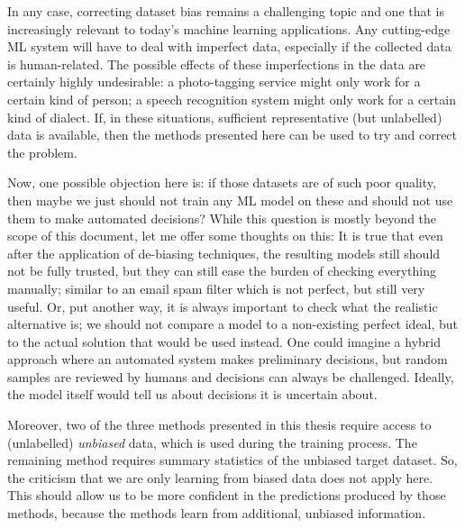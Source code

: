 

In any case, correcting dataset bias remains a challenging topic
and one that is increasingly relevant to today's machine learning applications.
Any cutting-edge \ac{ML} system will have to deal with imperfect data,
especially if the collected data is human-related.
The possible effects of these imperfections in the data are certainly highly undesirable:
a photo-tagging service might only work for a certain kind of person;
a speech recognition system might only work for a certain kind of dialect.
If, in these situations, sufficient representative (but unlabelled) data is available,
then the methods presented here can be used to try and correct the problem.

Now, one possible objection here is:
if those datasets are of such poor quality,
then maybe we just should not train any \ac{ML} model on these and should not use them to make automated decisions?
While this question is mostly beyond the scope of this document, let me offer some thoughts on this:
It is true that even after the application of de-biasing techniques,
the resulting models still should not be fully trusted,
but they can still ease the burden of checking everything manually;
similar to an email spam filter which is not perfect, but still very useful.
Or, put another way, it is always important to check what the realistic alternative is;
we should not compare a model to a non-existing perfect ideal, but to the actual solution that would be used instead.
One could imagine a hybrid approach where an automated system makes preliminary decisions,
but random samples are reviewed by humans and decisions can always be challenged.
Ideally, the model itself would tell us about decisions it is uncertain about.

Moreover, two of the three methods presented in this thesis require access to (unlabelled) \emph{unbiased} data,
which is used during the training process.
The remaining method requires summary statistics of the unbiased target dataset.
So, the criticism that we are only learning from biased data does not apply here.
This should allow us to be more confident in the predictions produced by those methods,
because the methods learn from additional, unbiased information.

